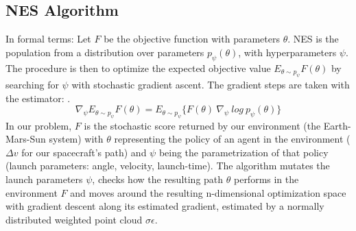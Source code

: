 \subsection{NES Algorithm}
In formal terms: Let \(F\) be the objective function with parameters \(\theta\). NES is the population from a distribution over parameters \(p_\psi (\theta)\), with hyperparameters \(\psi\). The procedure is then to optimize the expected objective value \(E_{\theta \sim p_\psi} F(\theta)\) by searching for \(\psi\) with stochastic gradient ascent. The gradient steps are taken with the estimator: \cite{Salimans2017}.
\begin{equation}
    \nabla_\psi E_{\theta \sim p_\psi} F(\theta)
    = E_{\theta \sim p_\psi} \{F(\theta)~\nabla_\psi~log~p_\psi(\theta)\}
\end{equation}
In our problem, \(F\) is the stochastic score returned by our environment (the Earth-Mars-Sun system) with \(\theta\) representing the policy of an agent in the environment ($\Delta v$ for our spacecraft's path) and \(\psi\) being the parametrization of that policy (launch parameters: angle, velocity, launch-time). The algorithm mutates the launch parameters \(\psi\), checks how the resulting path \(\theta\) performs in the environment \(F\) and moves around the resulting n-dimensional optimization space with gradient descent along its estimated gradient, estimated by a normally distributed weighted point cloud \(\sigma\epsilon\).



